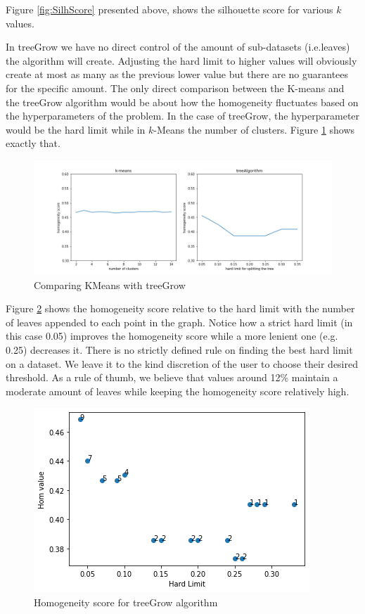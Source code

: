 \documentclass[sigconf]{acmart}
\begin{document}
Figure \ref{fig:SilhScore} presented above, shows the silhouette score for various $k$ values. 

In treeGrow we have no direct control of the amount of sub-datasets (i.e.leaves) the algorithm will create. Adjusting the hard limit to higher values will obviously create at most as many as the previous lower value but there are no guarantees for the specific amount. The only direct comparison between the K-means and the treeGrow algorithm would be about how the homogeneity fluctuates based on the hyperparameters of the problem. In the case of treeGrow, the hyperparameter would be the hard limit while in $k$-Means the number of clusters. 
Figure \ref{fig:medium_data} shows exactly that.
\begin{figure}
    \centering
    \includegraphics[scale=0.28]{images/medium_dataset.png}
    \caption{Comparing KMeans with treeGrow}
    \label{fig:medium_data}
\end{figure}

Figure \ref{fig:HomAmountOfLeaves} shows the homogeneity score relative to the hard limit with the number of leaves appended to each point in the graph. Notice how a strict hard limit (in this case 0.05) improves the homogeneity score while a more lenient one (e.g. 0.25) decreases it. There is no strictly defined rule on finding the best hard limit on a dataset. We leave it to the kind discretion of the user to choose their desired threshold. As a rule of thumb, we believe that values around 12\% maintain a moderate amount of leaves while keeping the homogeneity score relatively high.
\begin{figure}
    \centering
    \includegraphics[scale=0.55]{images/HomVsAmountOfLeavesForMedium.png}
    \caption{Homogeneity score for treeGrow algorithm}
    \label{fig:HomAmountOfLeaves}
\end{figure}
\end{document}
